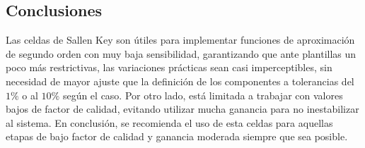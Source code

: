 \subsection{Conclusiones}
Las celdas de Sallen Key son \'utiles para implementar funciones de aproximaci\'on de segundo orden con muy baja sensibilidad, garantizando que ante plantillas un poco m\'as restrictivas, las variaciones
pr\'acticas sean casi imperceptibles, sin necesidad de mayor ajuste que la definici\'on de los componentes a tolerancias del $1\%$ o al $10\%$ seg\'un el caso. Por otro lado, est\'a limitada a trabajar con valores
bajos de factor de calidad, evitando utilizar mucha ganancia para no inestabilizar al sistema. En conclusi\'on, se recomienda el uso de esta celdas para aquellas etapas de bajo factor de calidad y ganancia moderada siempre
que sea posible.
